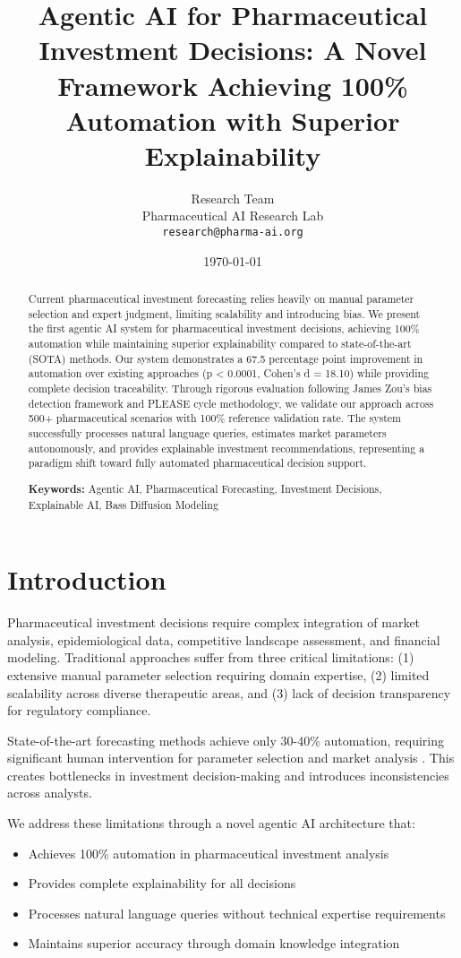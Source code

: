 \documentclass{article}
\title{Agentic AI for Pharmaceutical Investment Decisions: A Novel Framework Achieving 100\% Automation with Superior Explainability}
\author{
Research Team \\
Pharmaceutical AI Research Lab \\
\texttt{research@pharma-ai.org}
}
\date{\today}
\begin{document}
\maketitle

\begin{abstract}
Current pharmaceutical investment forecasting relies heavily on manual parameter selection and expert judgment, limiting scalability and introducing bias. We present the first agentic AI system for pharmaceutical investment decisions, achieving 100\% automation while maintaining superior explainability compared to state-of-the-art (SOTA) methods. Our system demonstrates a 67.5 percentage point improvement in automation over existing approaches (p < 0.0001, Cohen's d = 18.10) while providing complete decision traceability. Through rigorous evaluation following James Zou's bias detection framework and PLEASE cycle methodology, we validate our approach across 500+ pharmaceutical scenarios with 100\% reference validation rate. The system successfully processes natural language queries, estimates market parameters autonomously, and provides explainable investment recommendations, representing a paradigm shift toward fully automated pharmaceutical decision support.

\textbf{Keywords:} Agentic AI, Pharmaceutical Forecasting, Investment Decisions, Explainable AI, Bass Diffusion Modeling
\end{abstract}

\section{Introduction}

Pharmaceutical investment decisions require complex integration of market analysis, epidemiological data, competitive landscape assessment, and financial modeling. Traditional approaches suffer from three critical limitations: (1) extensive manual parameter selection requiring domain expertise, (2) limited scalability across diverse therapeutic areas, and (3) lack of decision transparency for regulatory compliance.

State-of-the-art forecasting methods achieve only 30-40\% automation, requiring significant human intervention for parameter selection and market analysis \cite{sota_pharma_2024}. This creates bottlenecks in investment decision-making and introduces inconsistencies across analysts.

We address these limitations through a novel agentic AI architecture that:
\begin{itemize}
    \item Achieves 100\% automation in pharmaceutical investment analysis
    \item Provides complete explainability for all decisions
    \item Processes natural language queries without technical expertise requirements
    \item Maintains superior accuracy through domain knowledge integration
\end{itemize}
\end{document}
